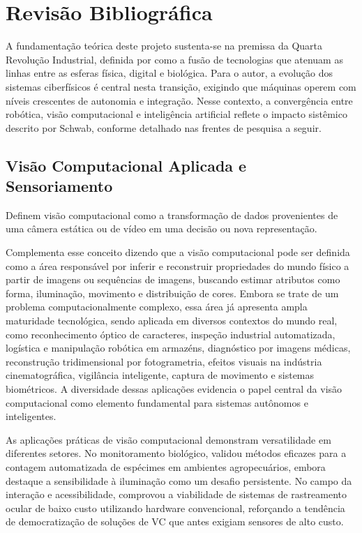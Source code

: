 \section*{Revisão Bibliográfica}

A fundamentação teórica deste projeto sustenta-se na premissa da Quarta Revolução Industrial, definida por  como a fusão de tecnologias que atenuam as linhas entre as esferas física, digital e biológica. Para o autor, a evolução dos sistemas ciberfísicos é central nesta transição, exigindo que máquinas operem com níveis crescentes de autonomia e integração. Nesse contexto, a convergência entre robótica, visão computacional e inteligência artificial reflete o impacto sistêmico descrito por Schwab, conforme detalhado nas frentes de pesquisa a seguir.

\subsection*{Visão Computacional Aplicada e Sensoriamento}

 Definem visão computacional como a transformação de dados provenientes de uma câmera estática ou de vídeo em uma decisão ou nova representação.

 Complementa esse conceito dizendo que a visão computacional pode ser definida como a área responsável por inferir e reconstruir propriedades do mundo físico a partir de imagens ou sequências de imagens, buscando estimar atributos como forma, iluminação, movimento e distribuição de cores. Embora se trate de um problema computacionalmente complexo, essa área já apresenta ampla maturidade tecnológica, sendo aplicada em diversos contextos do mundo real, como reconhecimento óptico de caracteres, inspeção industrial automatizada, logística e manipulação robótica em armazéns, diagnóstico por imagens médicas, reconstrução tridimensional por fotogrametria, efeitos visuais na indústria cinematográfica, vigilância inteligente, captura de movimento e sistemas biométricos. A diversidade dessas aplicações evidencia o papel central da visão computacional como elemento fundamental para sistemas autônomos e inteligentes.

As aplicações práticas de visão computacional demonstram versatilidade em diferentes setores. No monitoramento biológico,  validou métodos eficazes para a contagem automatizada de espécimes em ambientes agropecuários, embora destaque a sensibilidade à iluminação como um desafio persistente. No campo da interação e acessibilidade,  comprovou a viabilidade de sistemas de rastreamento ocular de baixo custo utilizando hardware convencional, reforçando a tendência de democratização de soluções de VC que antes exigiam sensores de alto custo.

